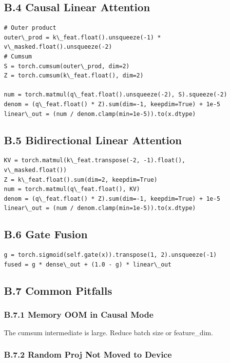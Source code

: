 \subsection{B.4 Causal Linear Attention}

\begin{lstlisting}
# Outer product
outer\_prod = k\_feat.float().unsqueeze(-1) * v\_masked.float().unsqueeze(-2)
# Cumsum
S = torch.cumsum(outer\_prod, dim=2)
Z = torch.cumsum(k\_feat.float(), dim=2)

num = torch.matmul(q\_feat.float().unsqueeze(-2), S).squeeze(-2)
denom = (q\_feat.float() * Z).sum(dim=-1, keepdim=True) + 1e-5
linear\_out = (num / denom.clamp(min=1e-5)).to(x.dtype)
\end{lstlisting}

\subsection{B.5 Bidirectional Linear Attention}

\begin{lstlisting}
KV = torch.matmul(k\_feat.transpose(-2, -1).float(), v\_masked.float())
Z = k\_feat.float().sum(dim=2, keepdim=True)
num = torch.matmul(q\_feat.float(), KV)
denom = (q\_feat.float() * Z).sum(dim=-1, keepdim=True) + 1e-5
linear\_out = (num / denom.clamp(min=1e-5)).to(x.dtype)
\end{lstlisting}

\subsection{B.6 Gate Fusion}

\begin{lstlisting}
g = torch.sigmoid(self.gate(x)).transpose(1, 2).unsqueeze(-1)
fused = g * dense\_out + (1.0 - g) * linear\_out
\end{lstlisting}

\subsection{B.7 Common Pitfalls}

\subsubsection{B.7.1 Memory OOM in Causal Mode}

The cumsum intermediate is large. Reduce batch size or feature\_dim.

\subsubsection{B.7.2 Random Proj Not Moved to Device}

